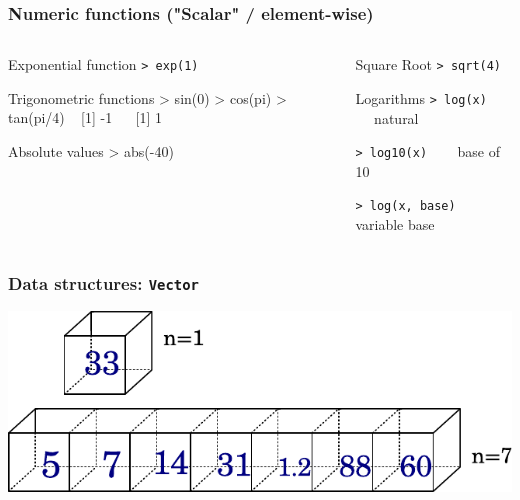 \documentclass[ucs]{beamer}
\begin{document}
 \begin{frame}
  \frametitle{Numeric functions ("Scalar" / element-wise)}
    \begin{columns}[T]
    \begin{column}{0.5\textwidth}
      \begin{block}{Exponential function}
\texttt{> exp(1)} 
      \end{block}
  
  \begin{block}{Trigonometric functions }
\footnotesize \ttfamily>\! sin(0) >\! cos(pi) >\! tan(pi/4)  ~  [1] -1 ~~  [1] 1
    \end{block}
    \begin{block}{Absolute values}
\ttfamily > abs(-40) 
  \end{block}    
  
  
    \end{column}
    \begin{column}{0.5\textwidth}
      
        \begin{block}{Square Root}
        \texttt{> sqrt(4)}
      \end{block}

\begin{block}{Logarithms}
\texttt{> log(x) } ~~ natural \newline

\texttt{> log10(x) } ~~ base of 10 \newline

\texttt{> log(x, base) } ~~ variable base \newline
\end{block}


      
    \end{column}
  \end{columns}
\end{frame}


\begin{frame}
  \frametitle{Data structures: \texttt{Vector} }
  \includegraphics[width=1\linewidth]{./imgs/vector.pdf}
\end{frame}
\end{document}

